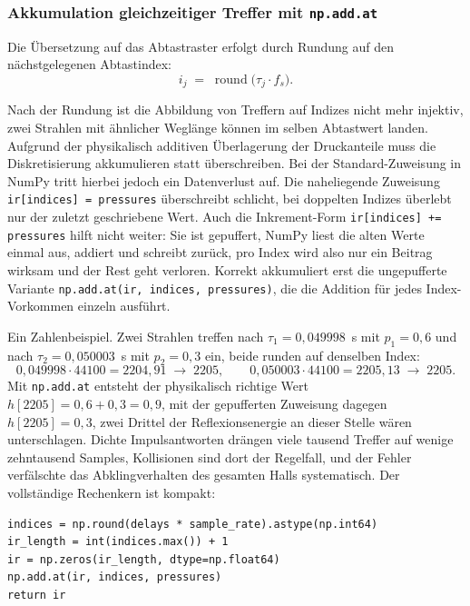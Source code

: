 \subsubsection{Akkumulation gleichzeitiger Treffer mit \texttt{np.add.at}}
\label{subsubsec:akkumulation}
Die Übersetzung auf das Abtastraster erfolgt durch Rundung auf den
nächstgelegenen Abtastindex:
\[
    i_j \;=\; \operatorname{round}\!\bigl(\tau_j \cdot f_s\bigr).
\]

Nach der Rundung ist die Abbildung von Treffern auf Indizes nicht mehr
injektiv, zwei Strahlen mit ähnlicher Weglänge können im selben Abtastwert
landen.
Aufgrund der physikalisch additiven Überlagerung der Druckanteile muss die Diskretisierung akkumulieren statt überschreiben.
Bei der Standard-Zuweisung in NumPy tritt hierbei jedoch ein Datenverlust auf.
Die naheliegende Zuweisung
\texttt{ir[indices] = pressures} überschreibt schlicht, bei doppelten Indizes
überlebt nur der zuletzt geschriebene Wert. Auch die Inkrement-Form
\texttt{ir[indices] += pressures} hilft nicht weiter: Sie ist gepuffert, NumPy
liest die alten Werte einmal aus, addiert und schreibt zurück, pro Index wird
also nur ein Beitrag wirksam und der Rest geht verloren.
Korrekt akkumuliert erst die ungepufferte Variante
\texttt{np.add.at(ir, indices, pressures)}, die die Addition für jedes
Index-Vorkommen einzeln ausführt.

Ein Zahlenbeispiel. Zwei Strahlen treffen nach
$\tau_1 = 0{,}049998$~s mit $p_1 = 0{,}6$ und nach $\tau_2 = 0{,}050003$~s mit
$p_2 = 0{,}3$ ein, beide runden auf denselben Index:
\[
    0{,}049998 \cdot 44100 = 2204{,}91 \;\to\; 2205,
    \qquad
    0{,}050003 \cdot 44100 = 2205{,}13 \;\to\; 2205.
\]
Mit \texttt{np.add.at} entsteht der physikalisch richtige Wert
$h[2205] = 0{,}6 + 0{,}3 = 0{,}9$, mit der gepufferten Zuweisung dagegen
$h[2205] = 0{,}3$, zwei Drittel der Reflexionsenergie an dieser Stelle wären
unterschlagen. Dichte Impulsantworten
drängen viele tausend Treffer auf wenige zehntausend Samples, Kollisionen sind
dort der Regelfall, und der Fehler verfälschte das Abklingverhalten des
gesamten Halls systematisch. Der vollständige Rechenkern ist kompakt:

\begin{lstlisting}[style=cemdsp, caption={Diskretisierung und Akkumulation in \texttt{build\_impulse\_response}.}, label={lst:build-ir}]
indices = np.round(delays * sample_rate).astype(np.int64)
ir_length = int(indices.max()) + 1
ir = np.zeros(ir_length, dtype=np.float64)
np.add.at(ir, indices, pressures)
return ir
\end{lstlisting}


